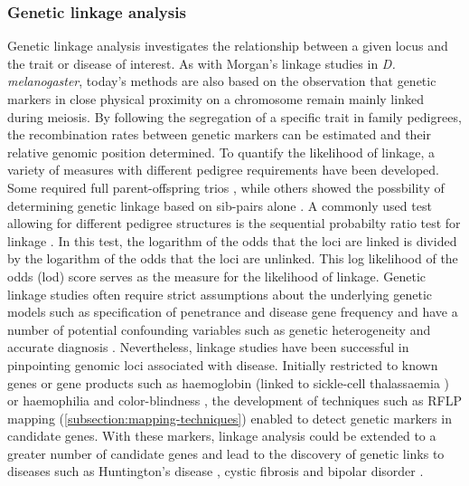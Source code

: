 \subsubsection{Genetic linkage analysis}
Genetic linkage analysis investigates the relationship between a given locus and the trait or disease of interest.  As with Morgan's linkage studies in \textit{D. melanogaster}, today's methods are also based on the observation that genetic markers in close physical proximity on a chromosome remain mainly linked during meiosis. By following the segregation of a specific trait in family pedigrees, the recombination rates between genetic markers can be estimated and their relative genomic position determined. To quantify the likelihood of linkage, a variety of measures with different pedigree requirements have been developed. Some required full parent-offspring trios \citep{Bernstein1930,Haldane1934}, while others showed the possbility of determining genetic linkage based on sib-pairs alone \citep{Penrose1935}. A commonly used test allowing for different pedigree structures is the sequential probabilty ratio test for linkage \citep{Morton1955,Pulst1999}. In this test, the logarithm of the odds that the loci are linked is divided by the logarithm of the odds that the loci are unlinked. This log likelihood of the odds (lod) score serves as the measure for the likelihood of linkage. Genetic linkage studies often require strict assumptions about the underlying genetic models such as specification of penetrance and disease gene frequency \citep{Morton1955,Pulst1999} and have a number of potential confounding variables such as genetic heterogeneity and accurate diagnosis \citep{Bird1993}. Nevertheless, linkage studies have been successful in pinpointing genomic loci associated with disease.  Initially restricted to known genes or gene products such as haemoglobin (linked to sickle-cell thalassaemia \citep{Ingram1959}) or haemophilia and color-blindness \citep{Haldane1947}, the development of techniques such as RFLP mapping (\cref{subsection:mapping-techniques}) enabled to detect genetic markers in candidate genes. With these markers, linkage analysis could be extended to a greater number of candidate genes and  lead to the discovery of genetic links to diseases such as Huntington's disease \citep{Gusella1983}, cystic fibrosis \citep{Kerem1989} and bipolar disorder \citep{Baron1987}. 

